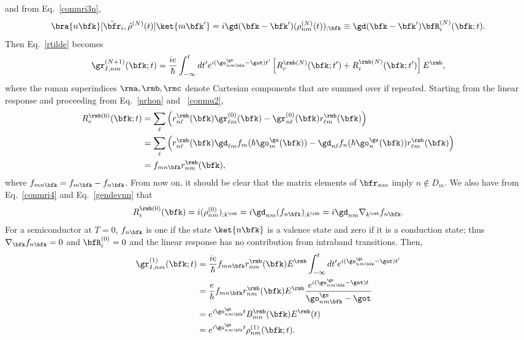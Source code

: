 \documentclass[floatfix,prb,aps,superscriptaddress,11pt,preprint,letterpaper]{revtex4}
\begin{document}
and from Eq.~\eqref{conmri3n},
\begin{equation}\label{conmri4}
\bra{n\bfk}[\hat\bfr_i,\hat\rho^{(N)}(t)]\ket{m\bfk'}
=i \gd(\bfk-\bfk') (\rho^{(N)}_{nm}(t))_{;\bfk}
\equiv \gd(\bfk-\bfk')\bfR_i^{(N)}(\bfk;t)
.
\end{equation}
Then Eq.~\eqref{rtilde} becomes
\begin{equation}\label{rtilde2}
\gr^{(N+1)}_{I,nm}(\bfk;t)
=\frac{ie}{\hbar}\int_{-\infty}^t dt'
e^{i(\go^\gs_{nm\bfk}-\got)t'}
\left[R_e^{\rmb(N)}(\bfk;t')+R_i^{\rmb(N)}(\bfk;t')\right]E^{\rmb}
,
\end{equation}
where the roman superindices
$\rma,\rmb,\rmc$ denote Cartesian components that are summed over if repeated.
Starting from the linear response and proceeding from Eq.~\eqref{nrhon} and ~\eqref{conmu2},
\begin{align}\label{R0e}
R_e^{\rmb(0)}(\bfk;t)
&=
\sum_{\ell}
\left(
r^{\rmb}_{n\ell}(\bfk)
\gr^{(0)}_{\ell m}(\bfk)
-
\gr^{(0)}_{n\ell}(\bfk)
r^{\rmb}_{\ell m}(\bfk)
\right)
\nonumber \\
&=
\sum_{\ell}
\left(
r^{\rmb}_{n\ell}(\bfk)
\gd_{\ell m}f_m(\hbar\go^\gs_m(\bfk))
-
\gd_{n\ell}f_n(\hbar\go^\gs_n(\bfk))
r^{\rmb}_{\ell m}(\bfk)
\right)
\nonumber \\
&=
f_{mn\bfk}
r^{\rmb}_{nm}(\bfk)
,
\end{align}
where $f_{mn\bfk}=f_{m\bfk}-f_{n\bfk}$.
From now on,
it should be clear that the matrix elements of $\bfr_{nm}$ imply
$n\notin D_m$.
We also have from Eq.~\eqref{conmri4} and Eq.~\eqref{gendevnn} that
\begin{equation}\label{R0i}
R_i^{\rmb(0)}(\bfk)=i(\rho^{(0)}_{nm})_{;k^{\rmb}}=i\gd_{nm}(f_{n\bfk})_{;k^{\rmb}}=i\gd_{nm}\nabla_{k^{\rmb}} f_{n\bfk}
.
\end{equation}
For a semiconductor at $T=0$, $f_{n\bfk}$ is one if the state
$\ket{n\bfk}$ is a valence state and zero if it is a conduction state; 
thus $\nabla_\bfk f_{n\bfk}=0$ and $\bfR_i^{(0)}=0$ and
the linear response has no contribution from
intraband transitions.
 Then,
\begin{align}\label{rtilde2n}
\gr^{(1)}_{I,nm}(\bfk;t)
&=\frac{ie}{\hbar}
f_{mn\bfk}
r^{\rmb}_{nm}(\bfk)E^{\rmb}
\int_{-\infty}^t dt'
e^{i(\go^\gs_{nm\bfk}-\got)t'}
\nonumber \\
&=\frac{e}{\hbar}
f_{mn\bfk}
r^{\rmb}_{nm}(\bfk)E^{\rmb}
\frac{e^{i(\go^\gs_{nm\bfk}-\got)t}}
{\go^\gs_{nm\bfk}-\got}
\nonumber \\
&=
e^{i\go^\gs_{nm\bfk}t}
B^{\rmb}_{mn}(\bfk)E^{\rmb}(t)
\nonumber \\
&=
e^{i\go^\gs_{nm\bfk}t}
\rho^{(1)}_{nm}(\bfk;t)
.
\end{align}
\end{document}
